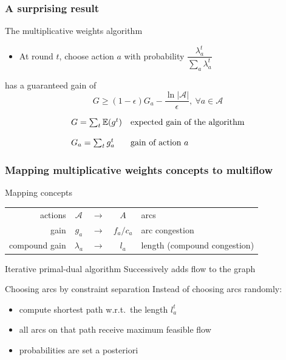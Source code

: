 \documentclass{beamer}
\begin{document}
\begin{frame}
    \frametitle{A surprising result}

    \begin{block}{The multiplicative weights algorithm}
        \begin{itemize}
            \item At round $t$, choose action $a$ with probability
                $\dfrac{\lambda_a^t}{\sum_a \lambda_a^t}$
        \end{itemize}
    \end{block}

    \begin{block}{has a guaranteed gain of}
        \begin{equation*}
            G \geq (1 - \epsilon) G_a - \frac{\ln |\mathcal{A}|}{\epsilon},
            ~\forall a \in \mathcal{A}
        \end{equation*}
    \end{block}
    
    \begin{equation*}
    \begin{array}{l l}
        G = \sum_t \mathbb{E}(g^t) & \text{expected gain of the algorithm}\\
        \\
        G_a = \sum_t g^t_a & \text{gain of action $a$}
    \end{array}
    \end{equation*}

\end{frame}

\begin{frame}
    \frametitle{Mapping multiplicative weights concepts to multiflow}

    \begin{block}{Mapping concepts}
    \begin{tabular}{r | c c c | l}
    actions & $\mathcal{A}$ & $\to$ & $A$ & arcs\\
    gain & $g_a$ & $\to$ & $f_a / c_a$ & arc congestion\\
    compound gain & $\lambda_a$ & $\to$ & $l_a$ & length (compound congestion)
    \end{tabular}
    \end{block}

    \begin{block}{Iterative primal-dual algorithm}
        Successively adds flow to the graph
    \end{block}
    
    \begin{block}{Choosing arcs by constraint separation}
        Instead of choosing arcs randomly:
        \begin{itemize}
            \item compute shortest path w.r.t.\ the length $l_a^t$
            \item all arcs on that path receive maximum feasible flow
            \item probabilities are set a posteriori
        \end{itemize}
    \end{block}
\end{frame}
\end{document}
